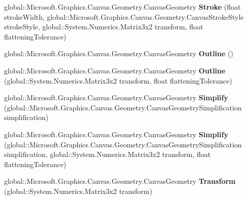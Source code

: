 \begin{DoxyCompactItemize}
global\+::\+Microsoft.\+Graphics.\+Canvas.\+Geometry.\+Canvas\+Geometry {\bfseries Stroke} (float stroke\+Width, global\+::\+Microsoft.\+Graphics.\+Canvas.\+Geometry.\+Canvas\+Stroke\+Style stroke\+Style, global\+::\+System.\+Numerics.\+Matrix3x2 transform, float flattening\+Tolerance)
\item 
\mbox{\label{interface_microsoft_1_1_graphics_1_1_canvas_1_1_geometry_1_1_i_canvas_geometry_a7b1a716eb0cbfbd552347d14e00268b7}} 
global\+::\+Microsoft.\+Graphics.\+Canvas.\+Geometry.\+Canvas\+Geometry {\bfseries Outline} ()
\item 
\mbox{\label{interface_microsoft_1_1_graphics_1_1_canvas_1_1_geometry_1_1_i_canvas_geometry_ab685f87179af5eed5881feb2e4aa5c22}} 
global\+::\+Microsoft.\+Graphics.\+Canvas.\+Geometry.\+Canvas\+Geometry {\bfseries Outline} (global\+::\+System.\+Numerics.\+Matrix3x2 transform, float flattening\+Tolerance)
\item 
\mbox{\label{interface_microsoft_1_1_graphics_1_1_canvas_1_1_geometry_1_1_i_canvas_geometry_a1420c252e6995b540a402dc6d2088ff0}} 
global\+::\+Microsoft.\+Graphics.\+Canvas.\+Geometry.\+Canvas\+Geometry {\bfseries Simplify} (global\+::\+Microsoft.\+Graphics.\+Canvas.\+Geometry.\+Canvas\+Geometry\+Simplification simplification)
\item 
\mbox{\label{interface_microsoft_1_1_graphics_1_1_canvas_1_1_geometry_1_1_i_canvas_geometry_a4b3fad1c94d6807ac4628caa31ddcdfa}} 
global\+::\+Microsoft.\+Graphics.\+Canvas.\+Geometry.\+Canvas\+Geometry {\bfseries Simplify} (global\+::\+Microsoft.\+Graphics.\+Canvas.\+Geometry.\+Canvas\+Geometry\+Simplification simplification, global\+::\+System.\+Numerics.\+Matrix3x2 transform, float flattening\+Tolerance)
\item 
\mbox{\label{interface_microsoft_1_1_graphics_1_1_canvas_1_1_geometry_1_1_i_canvas_geometry_ac5c73fa815ab9daab0120a273c2a9f7a}} 
global\+::\+Microsoft.\+Graphics.\+Canvas.\+Geometry.\+Canvas\+Geometry {\bfseries Transform} (global\+::\+System.\+Numerics.\+Matrix3x2 transform)

\end{DoxyCompactItemize}
